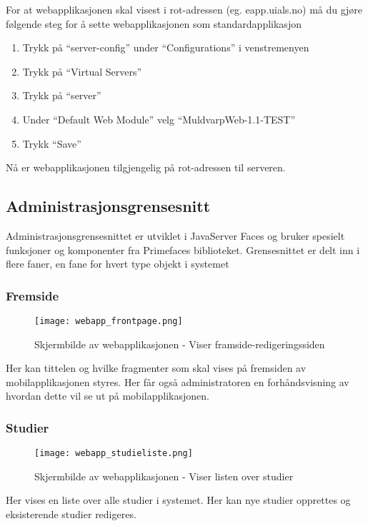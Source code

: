 \documentclass[../main.tex]{subfiles}
\begin{document}
For at webapplikasjonen skal visest i rot-adressen (eg. eapp.uials.no) må du gjøre følgende steg for å sette webapplikasjonen som standardapplikasjon

\begin{enumerate}
\item Trykk på “server-config” under “Configurations” i venstremenyen
\item Trykk på “Virtual Servers”
\item Trykk på “server”
\item Under “Default Web Module” velg “MuldvarpWeb-1.1-TEST”
\item Trykk “Save”
\end{enumerate}
Nå er webapplikasjonen tilgjengelig på rot-adressen til serveren.

\subsection{Administrasjonsgrensesnitt}

Administrasjonsgrensesnittet er utviklet i JavaServer Faces og bruker spesielt funksjoner og komponenter fra Primefaces biblioteket. Grensesnittet er delt inn i flere faner, en fane for hvert type objekt i systemet

\subsubsection{Fremside}

\begin{figure}[H]
  \centering
  \texttt{[image: webapp\_frontpage.png]}
  \caption{Skjermbilde av webapplikasjonen - Viser framside-redigeringssiden}
\end{figure}

Her kan tittelen og hvilke fragmenter som skal vises på fremsiden av mobilapplikasjonen styres. Her får også administratoren en forhåndsvisning av hvordan dette vil se ut på mobilapplikasjonen.

\subsubsection{Studier}

\begin{figure}[H]
  \centering
  \texttt{[image: webapp\_studieliste.png]}
  \caption{Skjermbilde av webapplikasjonen - Viser listen over studier}
\end{figure}

Her vises en liste over alle studier i systemet. Her kan nye studier opprettes og eksisterende studier redigeres.
\end{document}
